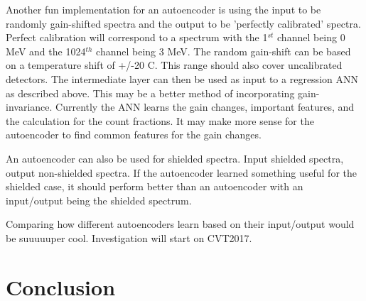\documentclass[thesis,tocnosub,noragright,centerchapter,12pt,fullpage]{uiucecethesis09}
\begin{document}
Another fun implementation for an autoencoder is using the input to be randomly gain-shifted spectra and the output to be 'perfectly calibrated' spectra. Perfect calibration will correspond to a spectrum with the 1$^{st}$ channel being 0 MeV and the 1024$^{th}$ channel being 3 MeV.  The random gain-shift can be based on a temperature shift of +/-20 C. This range should also cover uncalibrated detectors. The intermediate layer can then be used as input to a regression ANN as described above. This may be a better method of incorporating gain-invariance. Currently the ANN learns the gain changes, important features, and the calculation for the count fractions. It may make more sense for the autoencoder to find common features for the gain changes.

An autoencoder can also be used for shielded spectra. Input shielded spectra, output non-shielded spectra. If the autoencoder learned something useful for the shielded case, it should perform better than an autoencoder with an input/output being the shielded spectrum.




Comparing how different autoencoders learn based on their input/output would be suuuuuper cool. Investigation will start on CVT2017.









\chapter{Conclusion}



\end{document}
